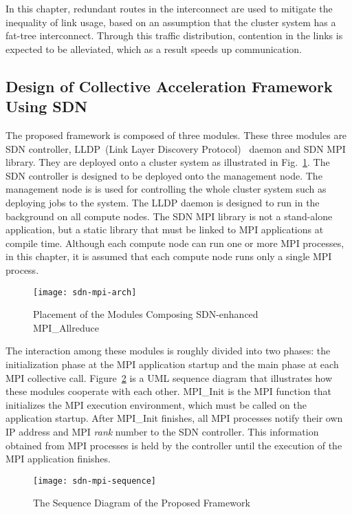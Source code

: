 In this chapter, redundant routes in the interconnect are used to mitigate the
inequality of link usage, based on an assumption that the cluster system has a
fat-tree interconnect. Through this traffic distribution, contention in the
links is expected to be alleviated, which as a result speeds up communication.

\subsection{Design of Collective Acceleration Framework Using SDN}

The proposed framework is composed of three modules. These three modules are
SDN controller, LLDP~(Link Layer Discovery Protocol)~\autocite{lldp}
daemon and SDN MPI library. They are deployed onto a
cluster system as illustrated in Fig.~\ref{fig:proposal-placement}.
The SDN controller is designed to be deployed onto the management node. The
management node is is used for controlling the whole cluster system such as
deploying jobs to the system. The LLDP daemon is designed to run in the
background on all compute nodes. The SDN MPI library is not a stand-alone
application, but a static library that must be linked to MPI applications at
compile time. Although each compute node can run one or more MPI processes, in
this chapter, it is assumed that each compute node runs only a single MPI
process.

\begin{figure}
    \centering
    \texttt{[image: sdn-mpi-arch]}
    \caption{Placement of the Modules Composing SDN-enhanced MPI\_Allreduce}%
    \label{fig:proposal-placement}
\end{figure}

The interaction among these modules is roughly divided into two phases: the
initialization phase at the MPI application startup and the main phase at each
MPI collective call. Figure~\ref{fig:proposal-sequence} is a UML sequence
diagram that illustrates how these modules cooperate with each other.
MPI\_Init is the MPI function that initializes the MPI execution environment,
which must be called on the application startup. After MPI\_Init finishes, all
MPI processes notify their own IP address and MPI \emph{rank} number to the
SDN controller. This information obtained from MPI processes is held by the
controller until the execution of the MPI application finishes.

\begin{figure}
    \centering
    \texttt{[image: sdn-mpi-sequence]}
    \caption{The Sequence Diagram of the Proposed Framework}%
    \label{fig:proposal-sequence}
\end{figure}

